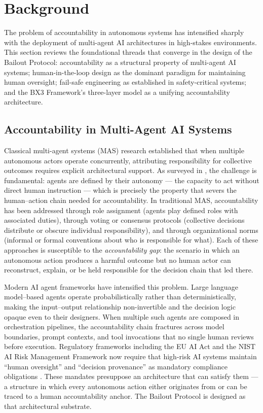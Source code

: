 \section{Background}
\label{sec:background}

The problem of accountability in autonomous systems has intensified sharply with the deployment of multi-agent AI architectures in high-stakes environments. This section reviews the foundational threads that converge in the design of the Bailout Protocol: accountability as a structural property of multi-agent AI systems; human-in-the-loop design as the dominant paradigm for maintaining human oversight; fail-safe engineering as established in safety-critical systems; and the BX3 Framework's three-layer model as a unifying accountability architecture.

\subsection{Accountability in Multi-Agent AI Systems}

Classical multi-agent systems (MAS) research established that when multiple autonomous actors operate concurrently, attributing responsibility for collective outcomes requires explicit architectural support. As surveyed in \cite{trist81}, the challenge is fundamental: agents are defined by their autonomy --- the capacity to act without direct human instruction --- which is precisely the property that severs the human--action chain needed for accountability. In traditional MAS, accountability has been addressed through role assignment (agents play defined roles with associated duties), through voting or consensus protocols (collective decisions distribute or obscure individual responsibility), and through organizational norms (informal or formal conventions about who is responsible for what). Each of these approaches is susceptible to the \textit{accountability gap}: the scenario in which an autonomous action produces a harmful outcome but no human actor can reconstruct, explain, or be held responsible for the decision chain that led there.

Modern AI agent frameworks have intensified this problem. Large language model--based agents operate probabilistically rather than deterministically, making the input--output relationship non-invertible and the decision logic opaque even to their designers. When multiple such agents are composed in orchestration pipelines, the accountability chain fractures across model boundaries, prompt contexts, and tool invocations that no single human reviews before execution. Regulatory frameworks including the EU AI Act and the NIST AI Risk Management Framework now require that high-risk AI systems maintain ``human oversight'' and ``decision provenance'' as mandatory compliance obligations \cite{trist81}. These mandates presuppose an architecture that can satisfy them --- a structure in which every autonomous action either originates from or can be traced to a human accountability anchor. The Bailout Protocol is designed as that architectural substrate.

